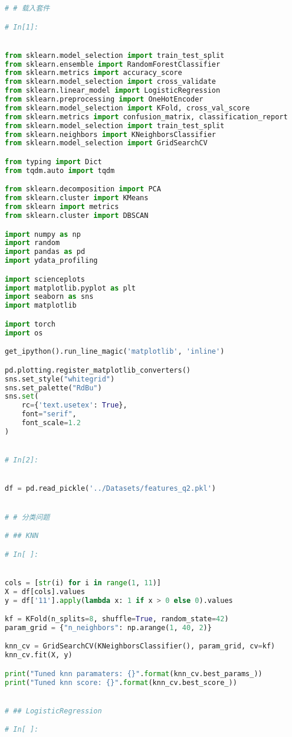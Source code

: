 \documentclass[withoutpreface,bwprint]{cumcmthesis}
\begin{document}
\begin{appendices}
\begin{lstlisting}[language=Python]
# # 载入套件

# In[1]:


from sklearn.model_selection import train_test_split
from sklearn.ensemble import RandomForestClassifier
from sklearn.metrics import accuracy_score
from sklearn.model_selection import cross_validate
from sklearn.linear_model import LogisticRegression
from sklearn.preprocessing import OneHotEncoder
from sklearn.model_selection import KFold, cross_val_score
from sklearn.metrics import confusion_matrix, classification_report
from sklearn.model_selection import train_test_split
from sklearn.neighbors import KNeighborsClassifier
from sklearn.model_selection import GridSearchCV

from typing import Dict
from tqdm.auto import tqdm

from sklearn.decomposition import PCA
from sklearn.cluster import KMeans
from sklearn import metrics
from sklearn.cluster import DBSCAN

import numpy as np
import random
import pandas as pd
import ydata_profiling

import scienceplots
import matplotlib.pyplot as plt
import seaborn as sns
import matplotlib

import torch
import os

get_ipython().run_line_magic('matplotlib', 'inline')

pd.plotting.register_matplotlib_converters()
sns.set_style("whitegrid")
sns.set_palette("RdBu")
sns.set(
    rc={'text.usetex': True},
    font="serif",
    font_scale=1.2
)


# In[2]:


df = pd.read_pickle('../Datasets/features_q2.pkl')


# # 分类问题

# ## KNN

# In[ ]:


cols = [str(i) for i in range(1, 11)]
X = df[cols].values
y = df['11'].apply(lambda x: 1 if x > 0 else 0).values

kf = KFold(n_splits=8, shuffle=True, random_state=42)
param_grid = {"n_neighbors": np.arange(1, 40, 2)}

knn_cv = GridSearchCV(KNeighborsClassifier(), param_grid, cv=kf)
knn_cv.fit(X, y)

print("Tuned knn paramaters: {}".format(knn_cv.best_params_))
print("Tuned knn score: {}".format(knn_cv.best_score_))


# ## LogisticRegression

# In[ ]:



\end{lstlisting}
\end{appendices}
\end{document}
